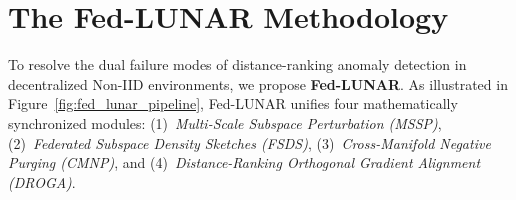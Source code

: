 
\section{The Fed-LUNAR Methodology}
\label{sec:methodology}

To resolve the dual failure modes of distance-ranking anomaly detection in decentralized Non-IID environments, we propose \textbf{Fed-LUNAR}. As illustrated in Figure~\ref{fig:fed_lunar_pipeline}, Fed-LUNAR unifies four mathematically synchronized modules:
(1)~\emph{Multi-Scale Subspace Perturbation (MSSP)},
(2)~\emph{Federated Subspace Density Sketches (FSDS)},
(3)~\emph{Cross-Manifold Negative Purging (CMNP)}, and
(4)~\emph{Distance-Ranking Orthogonal Gradient Alignment (DROGA)}.

